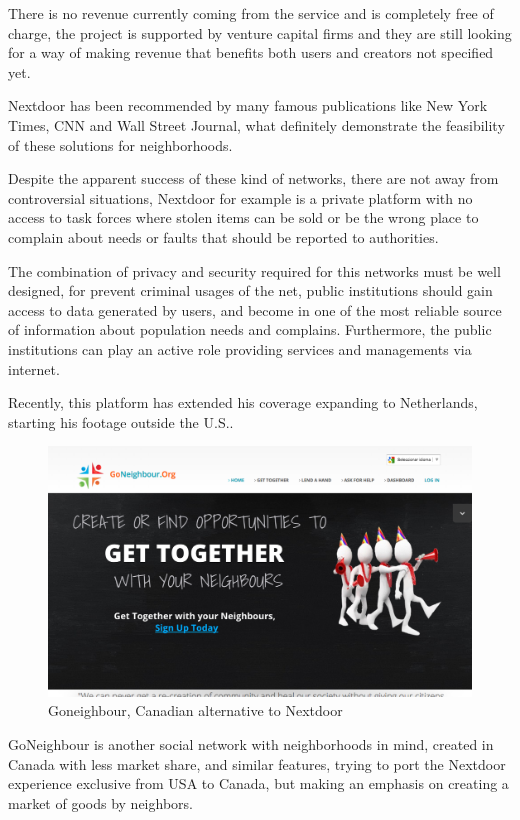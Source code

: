 \documentclass{DeustoFDP}
\begin{document}
There is no revenue currently coming from the service and is completely free of charge, the project is supported by venture capital firms \cite{venturebeat} and they are still looking for a way of making revenue that benefits both users and creators not specified yet.
 
Nextdoor has been recommended by many famous publications like New York Times, CNN and Wall Street Journal, what definitely demonstrate the feasibility of these solutions for neighborhoods.

Despite the apparent success of these kind of networks, there are not away from controversial situations, Nextdoor for example is a private platform with no access to task forces where stolen items can be sold \cite{geekwire} or be the wrong place to complain about needs or faults that should be reported to authorities.

The combination of privacy and security required for this networks must be well designed, for prevent criminal usages of the net, public institutions should gain access to data generated by users, and become in one of the most reliable source of information about population needs and complains. Furthermore, the public institutions can play an active role providing services and managements via internet.

Recently, this platform has extended his coverage expanding to Netherlands, starting his footage outside the U.S..

\begin{figure}[H]
\centering
\includegraphics[width=0.7\linewidth]{fig/goneighbor}
\caption[Goneighbour]{Goneighbour, Canadian alternative to Nextdoor}
\label{fig:goneighbor}
\end{figure}

GoNeighbour is another social network with neighborhoods in mind, created in Canada with less market share, and similar features, trying to port the Nextdoor experience exclusive from USA to Canada, but making an emphasis on creating a market of goods by neighbors.
\end{document}
